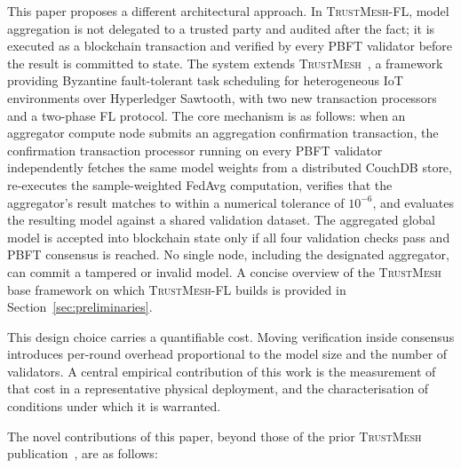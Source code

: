 \documentclass[lettersize,journal]{IEEEtran}
\newcommand{\tmfl}{\textsc{TrustMesh-FL}}
\newcommand{\tm}{\textsc{TrustMesh}}
\begin{document}
This paper proposes a different architectural approach. In \tmfl{}, model aggregation is
not delegated to a trusted party and audited after the fact; it is executed as a blockchain
transaction and verified by every PBFT validator before the result is committed to state.
The system extends \tm{}~\cite{rangwala2025trustmesh}, a framework providing Byzantine
fault-tolerant task scheduling for heterogeneous IoT environments over Hyperledger Sawtooth,
with two new transaction processors and a two-phase FL protocol. The core mechanism is as
follows: when an aggregator compute node submits an aggregation confirmation transaction,
the confirmation transaction processor running on every PBFT validator independently
fetches the same model weights from a distributed CouchDB store, re-executes the
sample-weighted FedAvg computation, verifies that the aggregator's result matches to within
a numerical tolerance of $10^{-6}$, and evaluates the resulting model against a shared
validation dataset. The aggregated global model is accepted into blockchain state only if
all four validation checks pass and PBFT consensus is reached. No single node, including
the designated aggregator, can commit a tampered or invalid model. A concise overview of
the \tm{} base framework on which \tmfl{} builds is provided in
Section~\ref{sec:preliminaries}.

This design choice carries a quantifiable cost. Moving verification inside consensus
introduces per-round overhead proportional to the model size and the number of validators.
A central empirical contribution of this work is the measurement of that cost in a
representative physical deployment, and the characterisation of conditions under which
it is warranted.

The novel contributions of this paper, beyond those of the prior \tm{}
publication~\cite{rangwala2025trustmesh}, are as follows:
\end{document}
